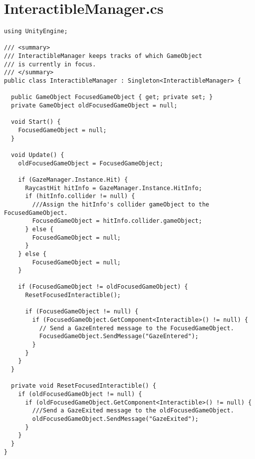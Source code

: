 \section{InteractibleManager.cs}
\begin{lstlisting}[caption=InteractibleManager.cs, label=code:InteractibleManager]
using UnityEngine;

/// <summary>
/// InteractibleManager keeps tracks of which GameObject
/// is currently in focus.
/// </summary>
public class InteractibleManager : Singleton<InteractibleManager> {

  public GameObject FocusedGameObject { get; private set; }
  private GameObject oldFocusedGameObject = null;

  void Start() {
	FocusedGameObject = null;
  }

  void Update() {
	oldFocusedGameObject = FocusedGameObject;

	if (GazeManager.Instance.Hit) {
	  RaycastHit hitInfo = GazeManager.Instance.HitInfo;
	  if (hitInfo.collider != null) {
		///Assign the hitInfo's collider gameObject to the FocusedGameObject.
		FocusedGameObject = hitInfo.collider.gameObject;
	  } else {
		FocusedGameObject = null;
	  }
	} else {
		FocusedGameObject = null;
	}

	if (FocusedGameObject != oldFocusedGameObject) {
	  ResetFocusedInteractible();

	  if (FocusedGameObject != null) {
		if (FocusedGameObject.GetComponent<Interactible>() != null) {
		  // Send a GazeEntered message to the FocusedGameObject.
		  FocusedGameObject.SendMessage("GazeEntered");
		}
	  }
	}
  }

  private void ResetFocusedInteractible() {
	if (oldFocusedGameObject != null) {
	  if (oldFocusedGameObject.GetComponent<Interactible>() != null) {
	  	///Send a GazeExited message to the oldFocusedGameObject.
		oldFocusedGameObject.SendMessage("GazeExited");
  	  }
  	}
  }
}
\end{lstlisting}
